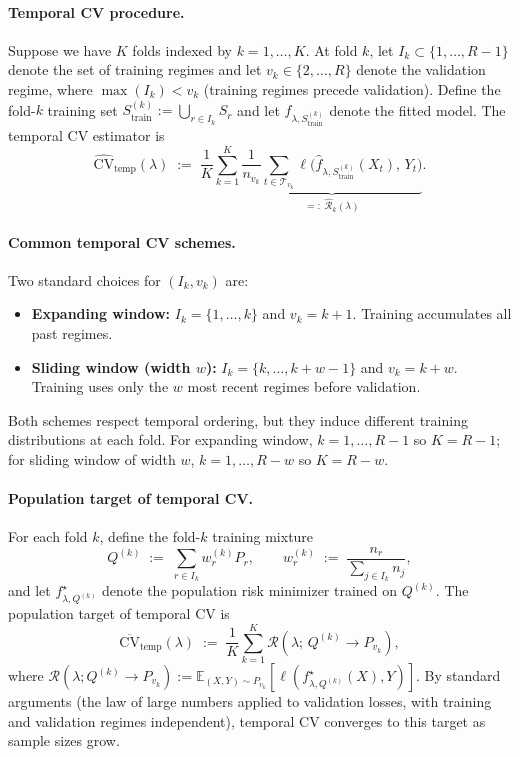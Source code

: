 \documentclass[11pt]{article}
\newcommand{\E}{\mathbb{E}}
\newcommand{\cR}{\mathcal{R}}
\begin{document}
\paragraph{Temporal CV procedure.}
Suppose we have $K$ folds indexed by $k = 1, \dots, K$. At fold $k$, let $I_k \subset \{1, \dots, R-1\}$
denote the set of training regimes and let $v_k \in \{2, \dots, R\}$ denote the validation regime,
where $\max(I_k) < v_k$ (training regimes precede validation). Define the fold-$k$ training set
$S^{(k)}_{\mathrm{train}} := \bigcup_{r \in I_k} S_r$ and let $\hat f_{\lambda, S^{(k)}_{\mathrm{train}}}$
denote the fitted model. The temporal CV estimator is
\[
\widehat{\mathrm{CV}}_{\mathrm{temp}}(\lambda)
\;:=\;
\frac{1}{K} \sum_{k=1}^{K}
\underbrace{\frac{1}{n_{v_k}} \sum_{t\in\mathcal T_{v_k}}
\ell\bigl(\hat f_{\lambda, S^{(k)}_{\mathrm{train}}}(X_{t}),\, Y_{t}\bigr)}_{\displaystyle =:\; \widehat{\cR}_k(\lambda)}.
\]

\paragraph{Common temporal CV schemes.}
Two standard choices for $(I_k, v_k)$ are:
\begin{itemize}
  \item \textbf{Expanding window:} $I_k = \{1, \dots, k\}$ and $v_k = k+1$. Training accumulates all
  past regimes.
  \item \textbf{Sliding window (width $w$):} $I_k = \{k, \dots, k+w-1\}$ and $v_k = k+w$. Training
  uses only the $w$ most recent regimes before validation.
\end{itemize}
Both schemes respect temporal ordering, but they induce different training distributions at each fold.
For expanding window, $k = 1, \dots, R-1$ so $K = R-1$; for sliding window of width $w$,
$k = 1, \dots, R-w$ so $K = R-w$.

\paragraph{Population target of temporal CV.}
For each fold $k$, define the fold-$k$ training mixture
\[
Q^{(k)} \;:=\; \sum_{r \in I_k} w_r^{(k)} P_r,
\qquad
w_r^{(k)} \;:=\; \frac{n_r}{\sum_{j \in I_k} n_j},
\]
and let $f^\star_{\lambda, Q^{(k)}}$ denote the population risk minimizer trained on $Q^{(k)}$.
The population target of temporal CV is
\[
\overline{\mathrm{CV}}_{\mathrm{temp}}(\lambda)
\;:=\;
\frac{1}{K} \sum_{k=1}^{K} \cR(\lambda;\, Q^{(k)} \to P_{v_k}),
\]
where $\cR(\lambda; Q^{(k)} \to P_{v_k}) := \E_{(X,Y) \sim P_{v_k}}[\ell(f^\star_{\lambda, Q^{(k)}}(X), Y)]$.
By standard arguments (the law of large numbers applied to validation losses, with training and
validation regimes independent), temporal CV converges to this target as sample sizes grow.
\end{document}

